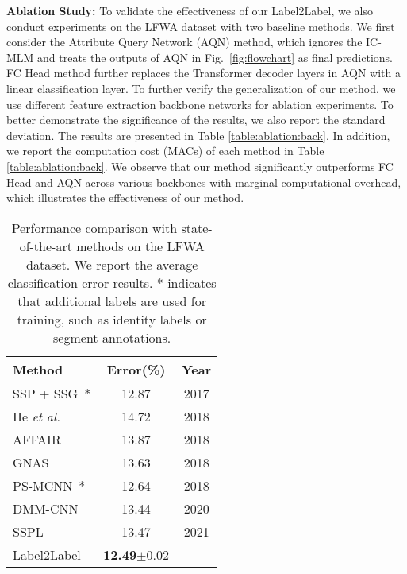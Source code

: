 \documentclass[runningheads]{llncs}
\begin{document}
\textbf{Ablation Study:} 
To validate the effectiveness of our Label2Label, we also conduct experiments on the LFWA dataset with two baseline methods. We first consider the Attribute Query Network (AQN) method, which ignores the IC-MLM and treats the outputs of AQN in Fig.~\ref{fig:flowchart} as final predictions. FC Head method further replaces the Transformer decoder layers in AQN with a linear classification layer. To further verify the generalization of our method, we use different feature extraction backbone networks for ablation experiments. To better demonstrate the significance of the results, we also report the standard deviation. The results are presented in Table \ref{table:ablation:back}.  In addition, we report the computation cost (MACs) of each method in Table \ref{table:ablation:back}.
We observe that our method significantly outperforms FC Head and AQN across various backbones with marginal computational overhead, which illustrates the effectiveness of our method.



\setlength{\intextsep}{0pt}
\begin{wraptable}{r}{.5\linewidth}
	\centering 
	\caption{Performance comparison with state-of-the-art methods on the LFWA dataset. We report the average classification error results. * indicates that additional labels are used for training, such as identity labels or segment annotations.}
	\label{table:result:lfw}
	\begin{tabular}{lcc}
    \toprule
    Method & Error(\%) &  Year\\
    \midrule
    SSP + SSG~\cite{kalayeh2017improving}* & 12.87 & 2017 \\
    He \emph{et al.}~\cite{he2018harnessing} & 14.72 & 2018 \\
    AFFAIR~\cite{li2018landmark} & 13.87 & 2018 \\
    GNAS~\cite{huang2018gnas} & 13.63 & 2018 \\
    PS-MCNN~\cite{cao2018partially}* & 12.64 & 2018 \\
    DMM-CNN~\cite{mao2020deep} & 13.44 & 2020\\
    SSPL~\cite{shu2021learning} & 13.47 & 2021 \\
    \midrule
    Label2Label & \textbf{12.49}$\pm$0.02 & - \\
    \bottomrule
    \end{tabular}
\end{wraptable}
\end{document}
